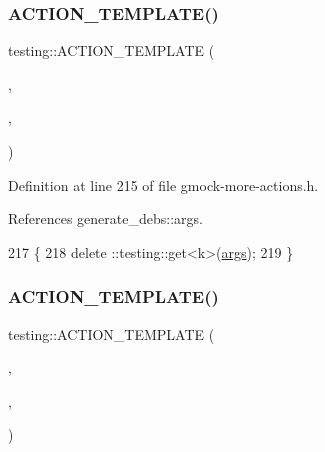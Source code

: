 \subsubsection{\texorpdfstring{A\+C\+T\+I\+O\+N\+\_\+\+T\+E\+M\+P\+L\+A\+T\+E()}{ACTION\_TEMPLATE()}\hspace{0.1cm}{\footnotesize\ttfamily [6/28]}}
{\footnotesize\ttfamily testing\+::\+A\+C\+T\+I\+O\+N\+\_\+\+T\+E\+M\+P\+L\+A\+TE (\begin{DoxyParamCaption}\item[{Delete\+Arg}]{,  }\item[{H\+A\+S\+\_\+1\+\_\+\+T\+E\+M\+P\+L\+A\+T\+E\+\_\+\+P\+A\+R\+A\+MS(int, k)}]{,  }\item[{A\+N\+D\+\_\+0\+\_\+\+V\+A\+L\+U\+E\+\_\+\+P\+A\+R\+A\+MS()}]{ }\end{DoxyParamCaption})}



Definition at line 215 of file gmock-\/more-\/actions.\+h.



References generate\+\_\+debs\+::args.


\begin{DoxyCode}
217                                       \{
218   delete ::testing::get<k>(\hyperlink{namespacegenerate__debs_a75f9143e38df82d83b2e8a6f99cae02c}{args});
219 \}
\end{DoxyCode}
\mbox{\label{namespacetesting_a8a02397c7fdf8e84d559ab72dcc28eb1}} 
\subsubsection{\texorpdfstring{A\+C\+T\+I\+O\+N\+\_\+\+T\+E\+M\+P\+L\+A\+T\+E()}{ACTION\_TEMPLATE()}\hspace{0.1cm}{\footnotesize\ttfamily [7/28]}}
{\footnotesize\ttfamily testing\+::\+A\+C\+T\+I\+O\+N\+\_\+\+T\+E\+M\+P\+L\+A\+TE (\begin{DoxyParamCaption}\item[{Invoke\+Argument}]{,  }\item[{H\+A\+S\+\_\+1\+\_\+\+T\+E\+M\+P\+L\+A\+T\+E\+\_\+\+P\+A\+R\+A\+MS(int, k)}]{,  }\item[{A\+N\+D\+\_\+0\+\_\+\+V\+A\+L\+U\+E\+\_\+\+P\+A\+R\+A\+MS()}]{ }\end{DoxyParamCaption})}




